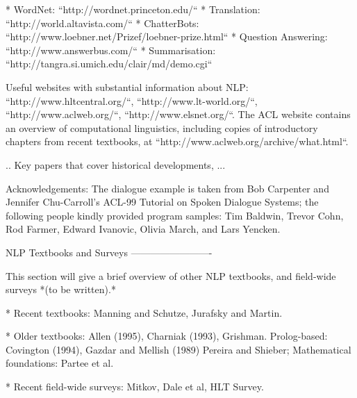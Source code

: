 \documentclass[presentation]{beamer}
\begin{document}
* WordNet: ``http://wordnet.princeton.edu/``
* Translation: ``http://world.altavista.com/``
* ChatterBots: ``http://www.loebner.net/Prizef/loebner-prize.html``
* Question Answering: ``http://www.answerbus.com/``
* Summarisation: ``http://tangra.si.umich.edu/clair/md/demo.cgi``

Useful websites with substantial information about NLP:
``http://www.hltcentral.org/``, ``http://www.lt-world.org/``,
``http://www.aclweb.org/``, ``http://www.elsnet.org/``.  The ACL
website contains an overview of computational linguistics, including
copies of introductory chapters from recent textbooks, at
``http://www.aclweb.org/archive/what.html``.


..    Key papers that cover historical developments, ...

Acknowledgements: The dialogue example is taken from Bob Carpenter and
Jennifer Chu-Carroll's ACL-99 Tutorial on Spoken Dialogue Systems; the
following people kindly provided program samples: Tim Baldwin, Trevor
Cohn, Rod Farmer, Edward Ivanovic, Olivia March, and Lars Yencken.

NLP Textbooks and Surveys
-------------------------

This section will give a brief overview of other NLP textbooks, and
field-wide surveys *(to be written).*

* Recent textbooks: Manning and Schutze, Jurafsky and Martin.

* Older textbooks: Allen (1995), Charniak (1993), Grishman.
  Prolog-based: Covington (1994), Gazdar and Mellish (1989)
  Pereira and Shieber; Mathematical foundations: Partee et al.

* Recent field-wide surveys: Mitkov, Dale et al, HLT Survey.
\end{document}
